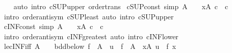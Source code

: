 \begin{isabellebody}
%
\isadelimproof
\ \ %
\endisadelimproof
%
\isatagproof
{}\isamarkupfalse%
\ {\isacharparenleft}{\kern0pt}auto\ intro{\isacharcolon}{\kern0pt}\ cSUP{\isacharunderscore}{\kern0pt}upper\ order{\isacharunderscore}{\kern0pt}trans{\isacharparenright}{\kern0pt}%
\endisatagproof
{\isafoldproof}%
%
\isadelimproof
\isanewline
%
\endisadelimproof
\isanewline
{}\isamarkupfalse%
\ cSUP{\isacharunderscore}{\kern0pt}const\ {\isacharbrackleft}{\kern0pt}simp{\isacharbrackright}{\kern0pt}{\isacharcolon}{\kern0pt}\ {\isachardoublequoteopen}A\ {\isasymnoteq}\ {\isacharbraceleft}{\kern0pt}{\isacharbraceright}{\kern0pt}\ {\isasymLongrightarrow}\ {\isacharparenleft}{\kern0pt}{\isasymSqunion}x{\isasymin}A{\isachardot}{\kern0pt}\ c{\isacharparenright}{\kern0pt}\ {\isacharequal}{\kern0pt}\ c{\isachardoublequoteclose}\isanewline
%
\isadelimproof
\ \ %
\endisadelimproof
%
\isatagproof
{}\isamarkupfalse%
\ {\isacharparenleft}{\kern0pt}intro\ order{\isachardot}{\kern0pt}antisym\ cSUP{\isacharunderscore}{\kern0pt}least{\isacharparenright}{\kern0pt}\ {\isacharparenleft}{\kern0pt}auto\ intro{\isacharcolon}{\kern0pt}\ cSUP{\isacharunderscore}{\kern0pt}upper{\isacharparenright}{\kern0pt}%
\endisatagproof
{\isafoldproof}%
%
\isadelimproof
\isanewline
%
\endisadelimproof
\isanewline
{}\isamarkupfalse%
\ cINF{\isacharunderscore}{\kern0pt}const\ {\isacharbrackleft}{\kern0pt}simp{\isacharbrackright}{\kern0pt}{\isacharcolon}{\kern0pt}\ {\isachardoublequoteopen}A\ {\isasymnoteq}\ {\isacharbraceleft}{\kern0pt}{\isacharbraceright}{\kern0pt}\ {\isasymLongrightarrow}\ {\isacharparenleft}{\kern0pt}{\isasymSqinter}x{\isasymin}A{\isachardot}{\kern0pt}\ c{\isacharparenright}{\kern0pt}\ {\isacharequal}{\kern0pt}\ c{\isachardoublequoteclose}\isanewline
%
\isadelimproof
\ \ %
\endisadelimproof
%
\isatagproof
{}\isamarkupfalse%
\ {\isacharparenleft}{\kern0pt}intro\ order{\isachardot}{\kern0pt}antisym\ cINF{\isacharunderscore}{\kern0pt}greatest{\isacharparenright}{\kern0pt}\ {\isacharparenleft}{\kern0pt}auto\ intro{\isacharcolon}{\kern0pt}\ cINF{\isacharunderscore}{\kern0pt}lower{\isacharparenright}{\kern0pt}%
\endisatagproof
{\isafoldproof}%
%
\isadelimproof
\isanewline
%
\endisadelimproof
\isanewline
{}\isamarkupfalse%
\ le{\isacharunderscore}{\kern0pt}cINF{\isacharunderscore}{\kern0pt}iff{\isacharcolon}{\kern0pt}\ {\isachardoublequoteopen}A\ {\isasymnoteq}\ {\isacharbraceleft}{\kern0pt}{\isacharbraceright}{\kern0pt}\ {\isasymLongrightarrow}\ bdd{\isacharunderscore}{\kern0pt}below\ {\isacharparenleft}{\kern0pt}f\ {\isacharbackquote}{\kern0pt}\ A{\isacharparenright}{\kern0pt}\ {\isasymLongrightarrow}\ u\ {\isasymle}\ {\isasymSqinter}{\isacharparenleft}{\kern0pt}f\ {\isacharbackquote}{\kern0pt}\ A{\isacharparenright}{\kern0pt}\ {\isasymlongleftrightarrow}\ {\isacharparenleft}{\kern0pt}{\isasymforall}x{\isasymin}A{\isachardot}{\kern0pt}\ u\ {\isasymle}\ f\ x{\isacharparenright}{\kern0pt}{\isachardoublequoteclose}\isanewline

\end{isabellebody}
